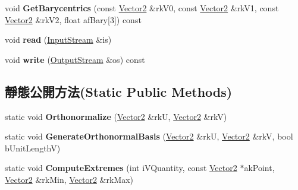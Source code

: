 \begin{DoxyCompactItemize}
\item 
void {\bfseries Get\+Barycentrics} (const \hyperlink{class_magnum_1_1_vector2}{Vector2} \&rk\+V0, const \hyperlink{class_magnum_1_1_vector2}{Vector2} \&rk\+V1, const \hyperlink{class_magnum_1_1_vector2}{Vector2} \&rk\+V2, float af\+Bary\mbox{[}3\mbox{]}) const \hypertarget{class_magnum_1_1_vector2_a403ee98493399cc3a634c71a0617625e}{}\label{class_magnum_1_1_vector2_a403ee98493399cc3a634c71a0617625e}

\item 
void {\bfseries read} (\hyperlink{class_magnum_1_1_input_stream}{Input\+Stream} \&is)\hypertarget{class_magnum_1_1_vector2_a466af4878ea452b46f4c3b2605be7e6d}{}\label{class_magnum_1_1_vector2_a466af4878ea452b46f4c3b2605be7e6d}

\item 
void {\bfseries write} (\hyperlink{class_magnum_1_1_output_stream}{Output\+Stream} \&os) const \hypertarget{class_magnum_1_1_vector2_a6473a1ff6ef471934663b314e2cc90a2}{}\label{class_magnum_1_1_vector2_a6473a1ff6ef471934663b314e2cc90a2}

\end{DoxyCompactItemize}
\subsection*{靜態公開方法(Static Public Methods)}
\begin{DoxyCompactItemize}
\item 
static void {\bfseries Orthonormalize} (\hyperlink{class_magnum_1_1_vector2}{Vector2} \&rkU, \hyperlink{class_magnum_1_1_vector2}{Vector2} \&rkV)\hypertarget{class_magnum_1_1_vector2_a9f06cbe514e4df1c4c14b3abebc8c6aa}{}\label{class_magnum_1_1_vector2_a9f06cbe514e4df1c4c14b3abebc8c6aa}

\item 
static void {\bfseries Generate\+Orthonormal\+Basis} (\hyperlink{class_magnum_1_1_vector2}{Vector2} \&rkU, \hyperlink{class_magnum_1_1_vector2}{Vector2} \&rkV, bool b\+Unit\+LengthV)\hypertarget{class_magnum_1_1_vector2_a8b7a7689c9df4f32c1f201be1ced15c3}{}\label{class_magnum_1_1_vector2_a8b7a7689c9df4f32c1f201be1ced15c3}

\item 
static void {\bfseries Compute\+Extremes} (int i\+V\+Quantity, const \hyperlink{class_magnum_1_1_vector2}{Vector2} $\ast$ak\+Point, \hyperlink{class_magnum_1_1_vector2}{Vector2} \&rk\+Min, \hyperlink{class_magnum_1_1_vector2}{Vector2} \&rk\+Max)\hypertarget{class_magnum_1_1_vector2_a3698b90ff411d61dc089861c95633b8a}{}\label{class_magnum_1_1_vector2_a3698b90ff411d61dc089861c95633b8a}

\end{DoxyCompactItemize}
